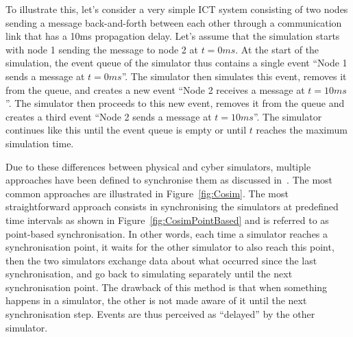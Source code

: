 To illustrate this, let's consider a very simple ICT system consisting of two nodes sending a message back-and-forth between each other through a communication link that has a 10ms propagation delay. Let's assume that the simulation starts with node 1 sending the message to node 2 at \(t=0ms\). At the start of the simulation, the event queue of the simulator thus contains a single event ``Node 1 sends a message at \(t=0ms\)''. The simulator then simulates this event, removes it from the queue, and creates a new event ``Node 2 receives a message at \(t=10ms\)''. The simulator then proceeds to this new event, removes it from the queue and creates a third event ``Node 2 sends a message at \(t=10ms\)''. The simulator continues like this until the event queue is empty or until \(t\) reaches the maximum simulation time.

Due to these differences between physical and cyber simulators, multiple approaches have been defined to synchronise them as discussed in~\cite{CosimFigure}. The most common approaches are illustrated in Figure~\ref{fig:Cosim}. The most straightforward approach consists in synchronising the simulators at predefined time intervals as shown in Figure~\ref{fig:CosimPointBased} and is referred to as point-based synchronisation. In other words, each time a simulator reaches a synchronisation point, it waits for the other simulator to also reach this point, then the two simulators exchange data about what occurred since the last synchronisation, and go back to simulating separately until the next synchronisation point. The drawback of this method is that when something happens in a simulator, the other is not made aware of it until the next synchronisation step. Events are thus perceived as ``delayed'' by the other simulator.

